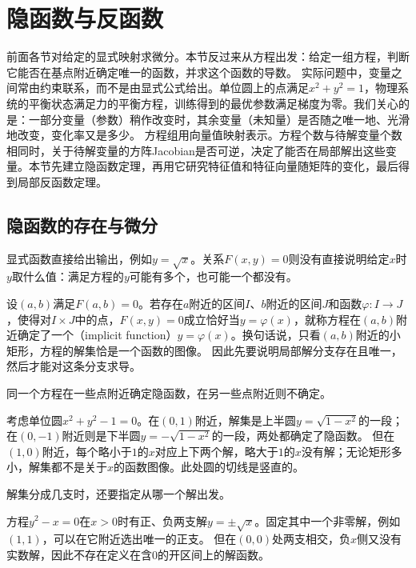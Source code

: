 
\section{隐函数与反函数}
\label{sec:analysis-implicit-parameter-integral}

前面各节对给定的显式映射求微分。本节反过来从方程出发：给定一组方程，判断它能否在基点附近确定唯一的函数，并求这个函数的导数。
实际问题中，变量之间常由约束联系，而不是由显式公式给出。单位圆上的点满足$x^2+y^2=1$，物理系统的平衡状态满足力的平衡方程，训练得到的最优参数满足梯度为零。我们关心的是：一部分变量（参数）稍作改变时，其余变量（未知量）是否随之唯一地、光滑地改变，变化率又是多少。
方程组用向量值映射表示。方程个数与待解变量个数相同时，关于待解变量的方阵Jacobian是否可逆，决定了能否在局部解出这些变量。本节先建立隐函数定理，再用它研究特征值和特征向量随矩阵的变化，最后得到局部反函数定理。

\subsection{隐函数的存在与微分}
\label{sec:multivariable-implicit-function}

显式函数直接给出输出，例如$y=\sqrt x$。关系$F(x,y)=0$则没有直接说明给定$x$时$y$取什么值：满足方程的$y$可能有多个，也可能一个都没有。

设$(a,b)$满足$F(a,b)=0$。若存在$a$附近的区间$I$、$b$附近的区间$J$和函数$\varphi:I\to J$，使得对$I\times J$中的点，$F(x,y)=0$成立恰好当$y=\varphi(x)$，就称方程在$(a,b)$附近确定了一个（implicit function）$y=\varphi(x)$。换句话说，只看$(a,b)$附近的小矩形，方程的解集恰是一个函数的图像。
因此先要说明局部解分支存在且唯一，然后才能对这条分支求导。

同一个方程在一些点附近确定隐函数，在另一些点附近则不确定。
\begin{example}[单位圆附近的隐函数]
\label{ex:multivariable-implicit-circle}
考虑单位圆$x^2+y^2-1=0$。在$(0,1)$附近，解集是上半圆$y=\sqrt{1-x^2}$的一段；在$(0,-1)$附近则是下半圆$y=-\sqrt{1-x^2}$的一段，两处都确定了隐函数。
但在$(1,0)$附近，每个略小于$1$的$x$对应上下两个解，略大于$1$的$x$没有解；无论矩形多小，解集都不是关于$x$的函数图像。此处圆的切线是竖直的。
\end{example}

解集分成几支时，还要指定从哪一个解出发。
\begin{example}[方程$y^2=x$的两支解]
\label{ex:multivariable-implicit-parabola-branches}
方程$y^2-x=0$在$x>0$时有正、负两支解$y=\pm\sqrt x$。固定其中一个非零解，例如$(1,1)$，可以在它附近选出唯一的正支。
但在$(0,0)$处两支相交，负$x$侧又没有实数解，因此不存在定义在含$0$的开区间上的解函数。
\end{example}


